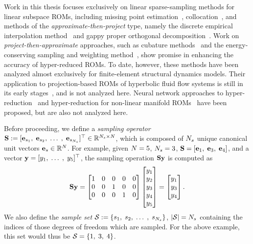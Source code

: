 Work in this thesis focuses exclusively on linear sparse-sampling methods for linear subspace ROMs, including missing point estimation~\cite{Astrid2004}, collocation~\cite{Bos2004}, and methods of the \textit{approximate-then-project} type, namely the discrete empirical interpolation method~\cite{Chaturantabut2010} and gappy proper orthogonal decomposition~\cite{Everson1995}. Work on \textit{project-then-approximate} approaches, such as cubature methods~\cite{An2008,Hernandez2017} and the energy-conserving sampling and weighting method~\cite{Farhat2014}, show promise in enhancing the accuracy of hyper-reduced ROMs. To date, however, these methods have been analyzed almost exclusively for finite-element structural dynamics models. Their application to projection-based ROMs of hyperbolic fluid flow systems is still in its early stages~\cite{Grimberg2020Hyper}, and is not analyzed here. Neural network approaches to hyper-reduction~\cite{nnHyperRed} and hyper-reduction for non-linear manifold ROMs~\cite{Kim2022} have been proposed, but are also not analyzed here.

Before proceeding, we define a \textit{sampling operator} $\mathbf{S} := [\mathbf{e}_{s_1}, \; \mathbf{e}_{s_2}, \; \hdots \;, \; \mathbf{e}_{s_{N_s}} ]^\top \in \mathbb{R}^{N_s \times N}$, which is composed of $N_s$ unique canonical unit vectors $\mathbf{e}_{s} \in \mathbb{R}^{N}$. For example, given $N = 5$, $N_s = 3$, $\mathbf{S} = [\mathbf{e}_1, \; \mathbf{e}_3, \; \mathbf{e}_4]$,
and a vector $\mathbf{y} = [y_1, \; \hdots \;, \; y_5]^\top$, the sampling operation $\mathbf{S} \mathbf{y}$ is computed as
%
\begin{equation}
	\mathbf{S} \mathbf{y} =
	\begin{bmatrix}
		1 & 0 & 0 & 0 & 0 \\
		0 & 0 & 1 & 0 & 0 \\
		0 & 0 & 0 & 1 & 0 \\
	\end{bmatrix}
	\begin{bmatrix}
		y_1 \\ y_2 \\ y_3 \\ y_4 \\ y_5
	\end{bmatrix} =
	\begin{bmatrix}
		y_1 \\ y_3 \\ y_4
	\end{bmatrix}.
\end{equation}
%
We also define the \textit{sample set} $\mathcal{S} := \{s_1, \; s_2, \; \hdots \;, \; s_{N_s}\}$, $| \mathcal{S} | = N_s$ containing the indices of those degrees of freedom which are sampled. For the above example, this set would thus be $\mathcal{S} = \{1, \; 3, \; 4\}$.

